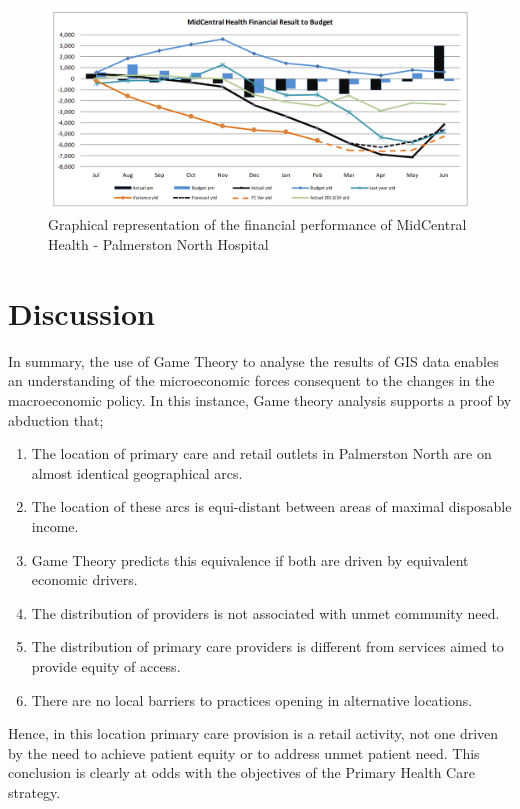 \documentclass[11pt,a4paper]{article}
\begin{document}
\begin{figure}[htp]
\centering
\includegraphics[scale=0.30]{MCHgraph.png}
\caption{Graphical representation of the financial performance of MidCentral Health - Palmerston North Hospital}
\label{}
\end{figure}

\pagebreak

\section{Discussion}


In summary, the use of Game Theory to analyse the results of GIS data enables an understanding of the microeconomic forces consequent to the changes in the macroeconomic policy. In this instance, Game theory analysis supports a proof by abduction that;

\begin{enumerate}
\item The location of primary care and retail outlets in Palmerston North are on almost identical geographical arcs.
\item The location of these arcs is equi-distant between areas of maximal disposable income.
\item Game Theory predicts this equivalence if both are driven by equivalent economic drivers.
\item The distribution of providers is not associated with unmet community need.
\item The distribution of primary care providers is different from services aimed to provide equity of access.
\item There are no local barriers to practices opening in alternative locations.
\end{enumerate}

Hence, in this location primary care provision is a retail activity, not one driven by the need to achieve patient equity or to address unmet patient need. This conclusion is clearly at odds with the objectives of the Primary Health Care strategy.
\end{document}
